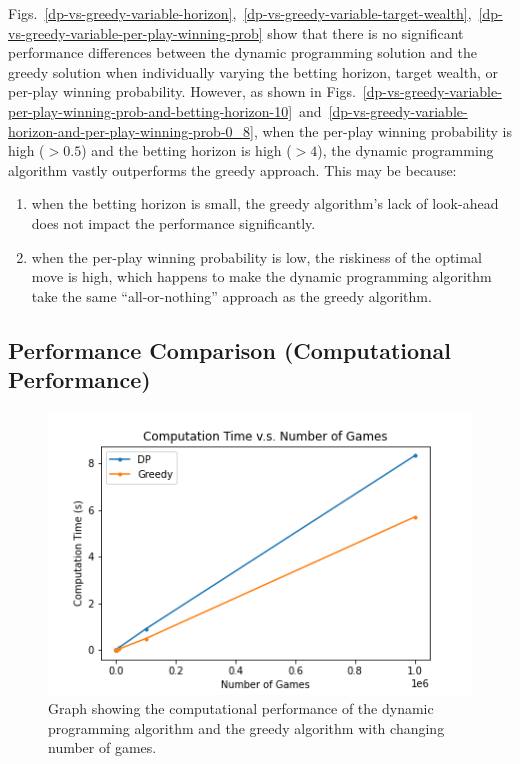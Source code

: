 \documentclass[conference]{IEEEtran}
\begin{document}
Figs.~\ref{dp-vs-greedy-variable-horizon},~\ref{dp-vs-greedy-variable-target-wealth},~\ref{dp-vs-greedy-variable-per-play-winning-prob} show that there is no significant performance differences between the dynamic programming solution and the greedy solution when individually varying the betting horizon, target wealth, or per-play winning probability. However, as shown in Figs.~\ref{dp-vs-greedy-variable-per-play-winning-prob-and-betting-horizon-10}~and~\ref{dp-vs-greedy-variable-horizon-and-per-play-winning-prob-0_8}, when the per-play winning probability is high ($> 0.5$) and the betting horizon is high ($> 4$), the dynamic programming algorithm vastly outperforms the greedy approach. This may be because:
\begin{enumerate}
    \item when the betting horizon is small, the greedy algorithm's lack of look-ahead does not impact the performance significantly.
    \item when the per-play winning probability is low, the riskiness of the optimal move is high, which happens to make the dynamic programming algorithm take the same ``all-or-nothing'' approach as the greedy algorithm.
\end{enumerate}

\subsection{Performance Comparison (Computational Performance)}

\begin{figure}[htbp]
\includegraphics[width=\columnwidth]{dp-vs-greedy-computation-time.png}
\caption{Graph showing the computational performance of the dynamic programming algorithm and the greedy algorithm with changing number of games.}
\label{dp-vs-greedy-computation-time}
\end{figure}
\end{document}
